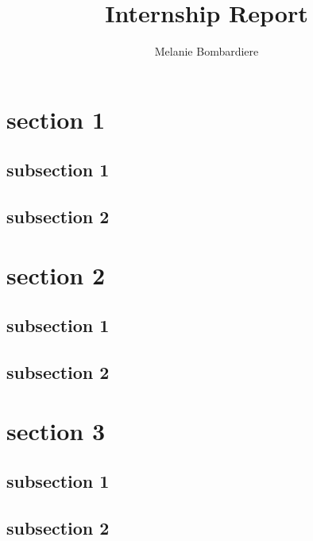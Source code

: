 \documentclass[11pt,a4paper]{report}
\begin{document}
\title{\textbf{Internship Report}}

\author{Melanie Bombardiere}

\maketitle

\pagestyle{fancy}
\fancyhead{}

\newpage

\section{section 1}
\subsection{subsection 1}
\subsection{subsection 2}
\section{section 2}
\subsection{subsection 1}
\subsection{subsection 2}
\section{section 3}
\subsection{subsection 1}
\subsection{subsection 2}
\end{document}
